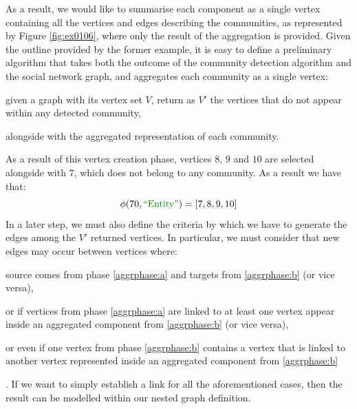 \begin{example}
	
%	
%	
%	
%	
	As a result, we would like to summarise each component as a single vertex containing all the vertices and edges describing the communities, as represented by Figure \ref{fig:ex0106}, where only the result of the aggregation is provided. Given the outline provided by the former example, it is easy to define a preliminary algorithm that takes both the outcome of the community detection algorithm and the social network graph, and aggregates each community as a single vertex: 
	\begin{alphalist} 
		\item \label{aggrphase:a} given a graph with its vertex set $V$, return as $V'$ the vertices that do not appear within any detected community, 
		\item \label{aggrphase:b} alongside with the aggregated representation of each community.
	\end{alphalist}
	As a result of this vertex creation phase, vertices $8$, $9$ and $10$ are selected alongside with $7$, which does not belong to any community. As a result we have that:
	\[\phi(70,\ONTA)=[7,8,9,10]\]
	In a later step, we must also define the criteria by which we have to generate the edges among the $V'$ returned vertices. In particular, we must consider that new edges may occur between vertices where:
	\begin{mylist}
		\item source comes from phase \ref{aggrphase:a} and targets from \ref{aggrphase:b} (or vice versa),
		\item or if vertices from phase \ref{aggrphase:a} are linked to at least one vertex appear inside an aggregated component from \ref{aggrphase:b} (or vice versa),
		\item or even if one vertex from phase \ref{aggrphase:b} contains a vertex that is linked to another vertex represented inside an aggregated component from \ref{aggrphase:b}
	\end{mylist}. If we want to simply establish a link for all the aforementioned cases, then the result can be modelled within our nested graph definition. 


\end{example}
